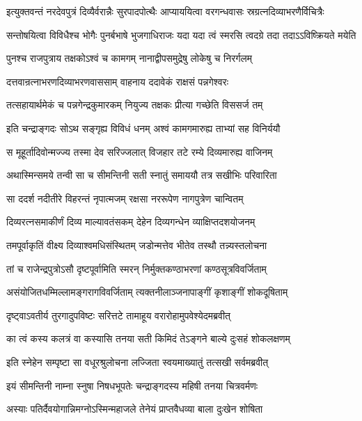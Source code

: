 \fourlineindentedshloka
{इत्युक्तवन्तं नरदेवपुत्रं}
{दिव्यैर्वरान्नैः सुरपादपोत्थैः}
{आप्याययित्वा वरगन्धवासः}
{स्रग्रत्नदिव्याभरणैर्विचित्रैः} %

\fourlineindentedshloka
{सन्तोषयित्वा विविधैश्च भोगैः}
{पुनर्बभाषे भुजगाधिराजः}
{यदा यदा त्वं स्मरसि त्वदग्रे}
{तदा तदाऽऽविष्क्रियते मयेति} %

\twolineshloka
{पुनश्च राजपुत्राय तक्षकोऽश्वं च कामगम्}
{नानाद्वीपसमुद्रेषु लोकेषु च निरर्गलम्} %

\twolineshloka
{दत्तवान्रत्नाभरणदिव्याभरणवाससाम्}
{वाहनाय ददावेकं राक्षसं पन्नगेश्वरः} %

\twolineshloka
{तत्सहायार्थमेकं च पन्नगेन्द्रकुमारकम्}
{नियुज्य तक्षकः प्रीत्या गच्छेति विससर्ज तम्} %

\twolineshloka
{इति चन्द्राङ्गदः सोऽथ सङ्गृह्य विविधं धनम्}
{अश्वं कामगमारुह्य ताभ्यां सह विनिर्ययौ} %

\twolineshloka
{स मूहूर्तादिवोन्मज्ज्य तस्मा देव सरिज्जलात्}
{विजहार तटे रम्ये दिव्यमारुह्य वाजिनम्} %

\twolineshloka
{अथास्मिन्समये तन्वी सा च सीमन्तिनी सती}
{स्नातुं समाययौ तत्र सखीभिः परिवारिता} %

\twolineshloka
{सा ददर्श नदीतीरे विहरन्तं नृपात्मजम्}
{रक्षसा नररूपेण नागपुत्रेण चान्वितम्} %

\twolineshloka
{दिव्यरत्नसमाकीर्णं दिव्य माल्यावतंसकम्}
{देहेन दिव्यगन्धेन व्याक्षिप्तदशयोजनम्} %

\twolineshloka
{तमपूर्वाकृतिं वीक्ष्य दिव्याश्वमधिसंस्थितम्}
{जडोन्मत्तेव भीतेव तस्थौ तन्न्यस्तलोचना} %

\twolineshloka
{तां च राजेन्द्रपुत्रोऽसौ दृष्टपूर्वामिति स्मरन्}
{निर्मुक्तकण्ठाभरणां कण्ठसूत्रविवर्जिताम्} %

\twolineshloka
{असंयोजितधम्मिल्लामङ्गरागविवर्जिताम्}
{त्यक्तनीलाञ्जनापाङ्गीं कृशाङ्गीं शोकदूषिताम्} %

\twolineshloka
{दृष्ट्वाऽवतीर्य तुरगादुपविष्टः सरित्तटे}
{तामाहूय वरारोहामुपवेश्येदमब्रवीत्} %

\twolineshloka
{का त्वं कस्य कलत्रं वा कस्यासि तनया सती}
{किमिदं तेऽङ्गने बाल्ये दुःसहं शोकलक्षणम्} %

\twolineshloka
{इति स्नेहेन सम्पृष्टा सा वधूरश्रुलोचना}
{लज्जिता स्वयमाख्यातुं तत्सखी सर्वमब्रवीत्} %

\twolineshloka
{इयं सीमन्तिनी नाम्ना स्नुषा निषधभूपतेः}
{चन्द्राङ्गदस्य महिषी तनया चित्रवर्मणः} %

\twolineshloka
{अस्याः पतिर्दैवयोगान्निमग्नोऽस्मिन्महाजले}
{तेनेयं प्राप्तवैधव्या बाला दुःखेन शोषिता} %

